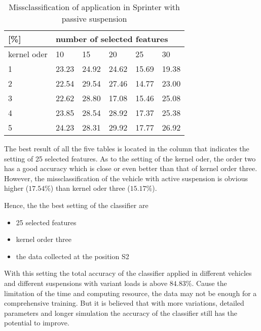 \begin{table}
\centering
\caption{Missclassification of application in Sprinter with passive suspension}
\label{tbl:setting_5}
\begin{tabular}{llllll}
\hline
{[}\%{]} & \multicolumn{5}{l}{number of selected features} \\ \hline
kernel oder & 10 & 15 & 20 & 25 & 30 \\ 
1 & 23.23 & 24.92 & 24.62 & 15.69 & 19.38 \\
2 & 22.54 & 29.54 & 27.46 & \cellcolor{blue!25}14.77 & 23.00 \\
3 & 22.62 & 28.80 & 17.08 & \cellcolor{blue!50}15.46 & 25.08 \\
4 & 23.85 & 28.54 & 28.92 & 17.37 & 25.38 \\
5 & 24.23 & 28.31 & 29.92 & 17.77 & 26.92 \\ \hline
\end{tabular}
\end{table}

The best result of all the five tables is located in the column that indicates the setting of 25 selected features.
%
As to the setting of the kernel oder, the order two has a good accuracy which is close or even better than that of kernel order three.
%
However, the missclassification of the vehicle with active suspension is obvious higher ($17.54\%$) than kernel oder three ($15.17\%$).

Hence, the the best setting of the classifier are
\begin{itemize}
\item 25 selected features
\item kernel order three
\item the data collected at the position S2
\end{itemize}

With this setting the total accuracy of the classifier applied in different vehicles and different suspensions with variant loads is above $84.83\%$. 
Cause the limitation of the time and computing resource, the data may not be enough for a comprehensive training.
%
But it is believed that with more variations, detailed parameters and longer simulation the accuracy of the classifier still has the potential to improve. 